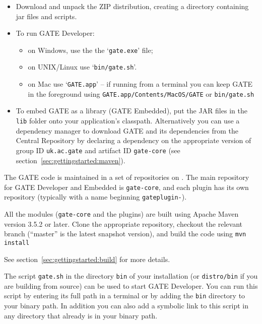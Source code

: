 

\begin{itemize}
\item
Download and unpack the ZIP distribution, creating a directory containing jar
files and scripts.
\item To run GATE Developer: 
  \begin{itemize}
  \item on Windows, use the the `\verb!gate.exe!' file;
  \item on UNIX/Linux use `\verb!bin/gate.sh!'.
  \item on Mac use `\verb!GATE.app!' -- if running from a terminal you can keep
  GATE in the foreground using \verb!GATE.app/Contents/MacOS/GATE! or
  \verb!bin/gate.sh!
  \end{itemize}
\item
To embed GATE as a library (GATE Embedded), put the JAR files in the
{\tt lib} folder onto your application's classpath.  Alternatively you can use
a dependency manager to download GATE and its dependencies from the Central
Repository by declaring a dependency on the appropriate version of group ID
\verb!uk.ac.gate! and artifact ID \verb!gate-core! (see
section~\ref{sec:gettingstarted:maven}).
\end{itemize}


\label{sec:gettingstarted:svn}

The GATE code is maintained in a set of repositories on
.
The main repository for GATE Developer and Embedded is \verb!gate-core!, and
each plugin has its own repository (typically with a name beginning
\verb!gateplugin-!).

All the modules (\verb!gate-core! and the plugins) are built using Apache Maven
version 3.5.2 or later.  Clone the appropriate repository, checkout the
relevant branch (``master'' is the latest snapshot version), and build the code
using \verb!mvn install!

See section~\ref{sec:gettingstarted:build} for more details.

%
The script \verb|gate.sh| in the directory \verb|bin| of your installation
(or \verb!distro/bin! if you are building from source)
can be used to start GATE Developer. You can run this script by entering
its full path in a terminal or by adding the \verb|bin| directory to your 
binary path. In addition you can also add a symbolic link to this script 
in any directory that already is in your binary path.

